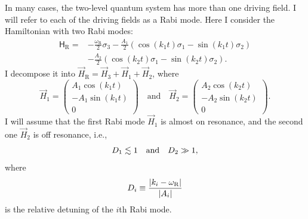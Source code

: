 In many cases, the two-level quantum system has more than one driving field. I will refer to each of the driving fields as a Rabi mode. Here I consider the Hamiltonian with two Rabi modes:
\begin{align}
    \mathsf H_{\mathrm R} =& -\frac{\omega_{\mathrm R}}{2}\sigma_3 - \frac{A_{1} }{2}  \left( \cos(k_{1} t )\sigma_1  - \sin(k_{1} t ) \sigma_2\right) \nonumber\\
    & - \frac{A_{2} }{2}  \left( \cos(k_{2} t)\sigma_1  - \sin(k_{2} t ) \sigma_2\right).
    \label{chap:matter-sec:single-frequency-eqn:hamiltonian-two-level}
\end{align}
I decompose it into $\vec{H}_{\mathrm R}=\vec{H}_3 + \vec{H}_{1} + \vec{H}_2$, where
\begin{equation*}
   \vec{H}_1 =  \begin{pmatrix}
    A_{1} \cos(k_{1}t) \\
    -A_{1} \sin(k_{1}t)  \\
    0
  \end{pmatrix} \quad\text{and}\quad   \vec{H}_2 =  \begin{pmatrix}
    A_{2} \cos(k_{2}t) \\
    -A_{2} \sin(k_{2}t)  \\
    0
     \end{pmatrix}.
\end{equation*}
I will assume that the first Rabi mode $\vec{H}_1$ is almost on resonance, and the second one $\vec H_2$ is off resonance, i.e.,%
\begin{equation}
D_1 \lesssim 1 \quad \text{and} \quad
D_2 \gg 1,
\end{equation}
where
\begin{equation}
D_i\equiv \frac{\lvert k_i -\omega_{\mathrm R}\rvert}{\lvert A_i\rvert}
\end{equation}
is the relative detuning of the $i$th Rabi mode.


